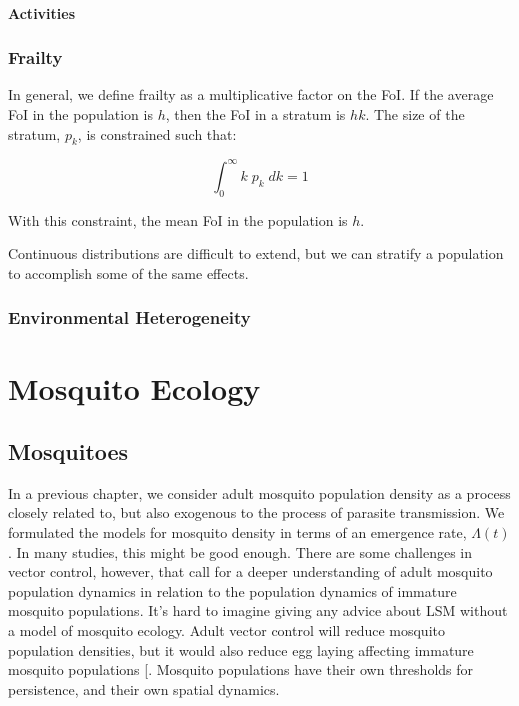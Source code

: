 \documentclass[
]{book}
\begin{document}
\subsection{Activities}\label{activities}

\section{Frailty}\label{frailtyCh}

In general, we define frailty as a multiplicative factor on the FoI. If the average FoI in the population is \(h\), then the FoI in a stratum is \(hk\). The size of the stratum, \(p_k\), is constrained such that:

\[\int_0^\infty k \; p_k \; dk = 1\]

With this constraint, the mean FoI in the population is \(h\).

Continuous distributions are difficult to extend, but we can stratify a population to accomplish some of the same effects.

\section{Environmental Heterogeneity}\label{environmentalHeterogeneity}

\part{Mosquito Ecology}\label{part-mosquito-ecology}

\chapter{Mosquitoes}\label{mosquitoes}

In a previous chapter, we consider adult mosquito population density as a process closely related to, but also exogenous to the process of parasite transmission. We formulated the models for mosquito density in terms of an emergence rate, \(\Lambda(t)\). In many studies, this might be good enough. There are some challenges in vector control, however, that call for a deeper understanding of adult mosquito population dynamics in relation to the population dynamics of immature mosquito populations. It's hard to imagine giving any advice about LSM without a model of mosquito ecology. Adult vector control will reduce mosquito population densities, but it would also reduce egg laying affecting immature mosquito populations {[}\citeproc{ref-BradyOJ2015AdultVector}{57}{]}. Mosquito populations have their own thresholds for persistence, and their own spatial dynamics.
\end{document}
